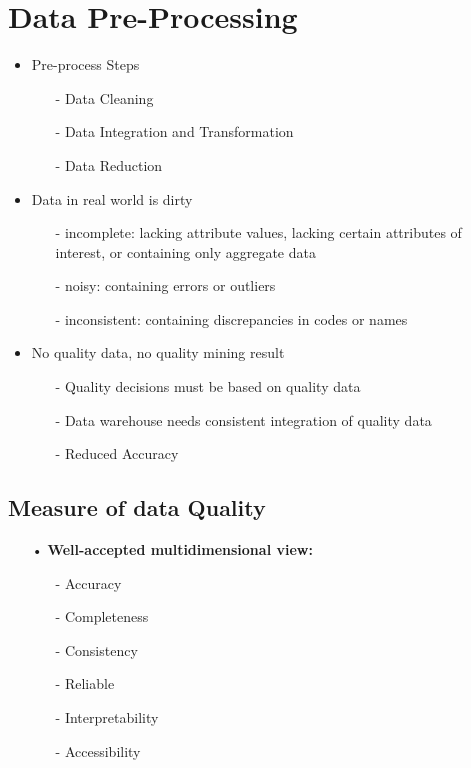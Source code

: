 \section{Data Pre-Processing}\label{sec:obj}
\begin{itemize}
\item Pre-process Steps
	\begin{itemize}
	\item[-] Data Cleaning
	\item[-] Data Integration and Transformation
	\item[-] Data Reduction
	\end{itemize}
\item Data in real world is dirty 
	\begin{itemize}
	\item[-]incomplete: lacking attribute values, lacking certain attributes of interest, or containing only aggregate data
	\item[-] noisy: containing errors or outliers
	\item[-] inconsistent: containing discrepancies in codes or names
    
	\end{itemize}
\item No quality data, no quality mining result
	\begin{itemize}
	\item[-] Quality decisions must be based on quality data
	\item[-] Data warehouse needs consistent integration of quality data
	\item[-] Reduced Accuracy
	\end{itemize}
\end{itemize}     
    
    
    
\subsection{Measure of data Quality}
    \begin{itemize}
    \item[•] \textbf{Well-accepted multidimensional view:}
    \begin{itemize}
    \item[-] Accuracy
    \item[-] Completeness
    \item[-] Consistency
    \item[-] Reliable
    \item[-] Interpretability         
    \item[-] Accessibility
    \end{itemize}     
    \end{itemize}

